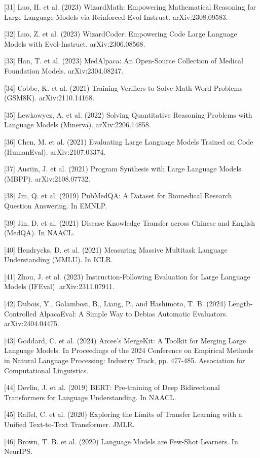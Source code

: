 \documentclass{article}
\begin{document}
{[31] Luo, H. et al. (2023) WizardMath: Empowering Mathematical Reasoning for Large Language Models via Reinforced Evol-Instruct. arXiv:2308.09583.

[32] Luo, Z. et al. (2023) WizardCoder: Empowering Code Large Language Models with Evol-Instruct. arXiv:2306.08568.

[33] Han, T. et al. (2023) MedAlpaca: An Open-Source Collection of Medical Foundation Models. arXiv:2304.08247.

[34] Cobbe, K. et al. (2021) Training Verifiers to Solve Math Word Problems (GSM8K). arXiv:2110.14168.

[35] Lewkowycz, A. et al. (2022) Solving Quantitative Reasoning Problems with Language Models (Minerva). arXiv:2206.14858.

[36] Chen, M. et al. (2021) Evaluating Large Language Models Trained on Code (HumanEval). arXiv:2107.03374.

[37] Austin, J. et al. (2021) Program Synthesis with Large Language Models (MBPP). arXiv:2108.07732.

[38] Jin, Q. et al. (2019) PubMedQA: A Dataset for Biomedical Research Question Answering. In EMNLP.

[39] Jin, D. et al. (2021) Disease Knowledge Transfer across Chinese and English (MedQA). In NAACL.

[40] Hendrycks, D. et al. (2021) Measuring Massive Multitask Language Understanding (MMLU). In ICLR.

[41] Zhou, J. et al. (2023) Instruction-Following Evaluation for Large Language Models (IFEval). arXiv:2311.07911.

[42] Dubois, Y., Galambosi, B., Liang, P., and Hashimoto, T. B. (2024) Length-Controlled AlpacaEval: A Simple Way to Debias Automatic Evaluators. arXiv:2404.04475.

[43] Goddard, C. et al. (2024) Arcee’s MergeKit: A Toolkit for Merging Large Language Models. In Proceedings of the 2024 Conference on Empirical Methods in Natural Language Processing: Industry Track, pp. 477-485. Association for Computational Linguistics.  

[44] Devlin, J. et al. (2019) BERT: Pre-training of Deep Bidirectional Transformers for Language Understanding. In NAACL.

[45] Raffel, C. et al. (2020) Exploring the Limits of Transfer Learning with a Unified Text-to-Text Transformer. JMLR.

[46] Brown, T. B. et al. (2020) Language Models are Few-Shot Learners. In NeurIPS.

}
\end{document}
